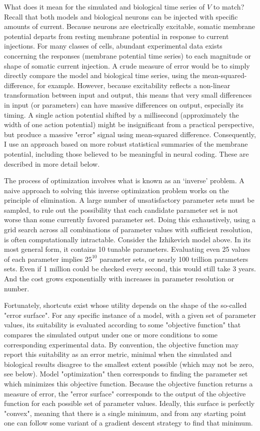 What does it mean for the simulated and biological time series of $V$ to match?
Recall that both models and biological neurons can be injected with specific amounts of current. Because neurons are electrically excitable, somatic membrane potential departs from resting membrane potential in response to current injections.
For many classes of cells, abundant experimental data exists concerning the responses (membrane potential time series) to each magnitude or shape of somatic current injection.
A crude measure of error would be to simply directly compare the model and biological time series, using the mean-squared-difference, for example.
However, because excitability reflects a non-linear transformation between input and output, this means that very small differences in input (or parameters) can have massive differences on output, especially its timing.
A single action potential shifted by a millisecond (approximately the width of one action potential) might be insignificant from a practical perspective, but produce a massive "error" signal using mean-squared difference.
Consequently, I use an approach based on more robust statistical summaries of the membrane potential, including those believed to be meaningful in neural coding.
These are described in more detail below.

The process of optimization involves what is known as an ‘inverse’ problem.
A naive approach to solving this inverse optimization problem works on the principle of elimination.
A large number of unsatisfactory parameter sets must be sampled, to rule out the possibility that each candidate parameter set is not worse than some currently favored parameter set.
Doing this exhaustively, using a grid search across all combinations of parameter values with sufficient resolution, is often  computationally intractable.
Consider the Izhikevich model above.
In its most general form, it contains 10 tunable parameters.
Evaluating even 25 values of each parameter implies $25^10$ parameter sets, or nearly 100 trillion parameters sets.
Even if 1 million could be checked every second, this would still take 3 years.
And the cost grows exponentially with increases in parameter resolution or number.

Fortunately, shortcuts exist whose utility depends on the shape of the so-called "error surface".
For any specific instance of a model, with a given set of parameter values, its suitability is evaluated according to some "objective function" that compares the simulated output under one or more conditions to some corresponding experimental data.
By convention, the objective function may report this suitability as an error metric, minimal when the simulated and biological results disagree to the smallest extent possible (which may not be zero, see below).
Model "optimization" then corresponds to finding the parameter set which minimizes this objective function. 
Because the objective function returns a measure of error, the "error surface" corresponds to the output of the objective function for each possible set of parameter values.
Ideally, this surface is perfectly "convex", meaning that there is a single minimum, and from any starting point one can follow some variant of a gradient descent strategy to find that minimum.  

